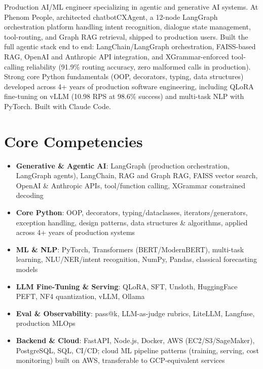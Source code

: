 \documentclass[11pt,a4paper,sans]{moderncv}
\begin{document}
\makecvtitle


\vspace{6pt}
\small{Production AI/ML engineer specializing in agentic and generative AI systems. At Phenom People, architected chatbotCXAgent, a 12-node LangGraph orchestration platform handling intent recognition, dialogue state management, tool-routing, and Graph RAG retrieval, shipped to production users. Built the full agentic stack end to end: LangChain/LangGraph orchestration, FAISS-based RAG, OpenAI and Anthropic API integration, and XGrammar-enforced tool-calling reliability (91.9\% routing accuracy, zero malformed calls in production). Strong core Python fundamentals (OOP, decorators, typing, data structures) developed across 4+ years of production software engineering, including QLoRA fine-tuning on vLLM (10.98 RPS at 98.6\% success) and multi-task NLP with PyTorch. Built with Claude Code.}


\section{Core Competencies}
\vspace{1pt}
\begin{itemize}

\item \textbf{Generative \& Agentic AI}: LangGraph (production orchestration, LangGraph agents), LangChain, RAG and Graph RAG, FAISS vector search, OpenAI \& Anthropic APIs, tool/function calling, XGrammar constrained decoding

\item \textbf{Core Python}: OOP, decorators, typing/dataclasses, iterators/generators, exception handling, design patterns, data structures \& algorithms, applied across 4+ years of production systems

\item \textbf{ML \& NLP}: PyTorch, Transformers (BERT/ModernBERT), multi-task learning, NLU/NER/intent recognition, NumPy, Pandas, classical forecasting models

\item \textbf{LLM Fine-Tuning \& Serving}: QLoRA, SFT, Unsloth, HuggingFace PEFT, NF4 quantization, vLLM, Ollama

\item \textbf{Eval \& Observability}: pass@k, LLM-as-judge rubrics, LiteLLM, Langfuse, production MLOps

\item \textbf{Backend \& Cloud}: FastAPI, Node.js, Docker, AWS (EC2/S3/SageMaker), PostgreSQL, SQL, CI/CD; cloud ML pipeline patterns (training, serving, cost monitoring) built on AWS, transferable to GCP-equivalent services

\end{itemize}
\end{document}

